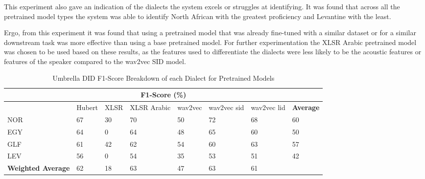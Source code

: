 This experiment also gave an indication of the dialects the system excels or struggles at identifying. It was found that across all the pretrained model types 
the system was able to identify North African with the greatest proficiency and Levantine with the least.  

Ergo, from this experiment it was found that using a pretrained model that was already fine-tuned with a similar dataset or for a similar downstream task was more 
effective than using a base pretrained model. For further experimentation the XLSR Arabic pretrained model was chosen to be used based on these results, as the features used to differentiate the  
dialects were less likely to be the acoustic features or features of the speaker compared to the wav2vec SID model. 

\begin{table}[h!]
    \centering
    \caption{Umbrella DID F1-Score Breakdown of each Dialect for Pretrained Models}
    \label{tab:f1pretrain}
    \begin{tabular}{|l|l|l|l|l|l|l|l|} 
    \hline
    \multicolumn{8}{|c|}{\textbf{F1-Score (\%)}}                                                                                                                                                 \\ 
    \hline
                                                       & Hubert & XLSR & XLSR Arabic & wav2vec & wav2vec sid & wav2vec lid & \textbf{Average}  \\ 
    \hline
    NOR                                                & 67     & 30        & 70          & 50               & 72          & 68          & 60 \\ 
    \hline
    EGY                                                & 64     & 0         & 64          & 48               & 65          & 60          & 50 \\ 
    \hline
    GLF                                                & 61     & 42        & 62          & 54               & 60          & 63          & 57 \\ 
    \hline
    LEV                                                & 56     & 0         & 54          & 35               & 53          & 51          & 42 \\ 
    \hline
    \textbf{Weighted Average} & 62     & 18        & 63          & 47               & 63          & 61          &                                                       \\
    \hline
    \end{tabular}
    \end{table}


